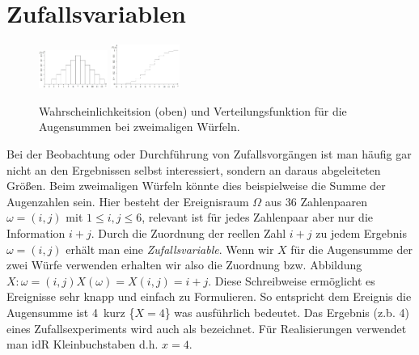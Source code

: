 \section{Zufallsvariablen}
\begin{figure}
    \vspace{-10mm}
    \centering
    \includegraphics[width=0.2\textwidth]{images/5.1_f_augensumme.png}
    \includegraphics[width=0.2\textwidth]{images/5.2_F_augensumme.png}
    \caption{Wahrscheinlichkeitsion (oben) und Verteilungsfunktion für die Augensummen bei zweimaligen Würfeln.}
    \vspace{-3mm}
    \label{fig:f_F_dice}
\end{figure}
Bei der Beobachtung oder Durchführung von Zufallsvorgängen ist man häufig gar nicht an den Ergebnissen selbst interessiert, sondern an daraus abgeleiteten Größen. Beim zweimaligen Würfeln könnte dies beispielweise die Summe der Augenzahlen sein. Hier besteht der Ereignisraum $\Omega$ aus 36 Zahlenpaaren $\omega = (i, j)$ mit $1 \le i,j \le 6$, relevant ist für jedes Zahlenpaar aber nur die Information $i + j$. Durch die Zuordnung der reellen Zahl $i + j$ zu jedem Ergebnis $\omega = (i, j)$ erhält man eine \emph{Zufallsvariable}. Wenn wir $X$ für die Augensumme der zwei Würfe verwenden erhalten wir also die Zuordnung bzw. Abbildung $X: \omega = (i, j) X(\omega) = X(i, j) = i + j$. Diese Schreibweise ermöglicht es Ereignisse sehr knapp und einfach zu Formulieren. So entspricht dem Ereignis \glqq die Augensumme ist 4\grqq\, kurz \{$X=4$\} was ausführlich  bedeutet. Das Ergebnis (z.b. 4) eines Zufallsexperiments wird auch als  bezeichnet. Für Realisierungen verwendet man idR Kleinbuchstaben d.h. $x=4$.
